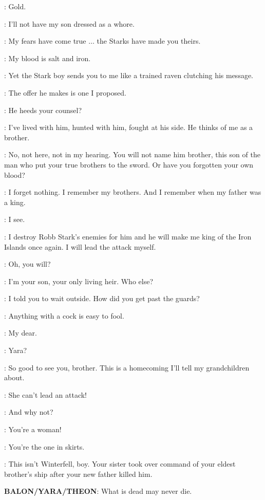 \THEON: Gold.

\BALON: I'll not have my son dressed as a whore.


\BALON: My fears have come true $\ldots$ the Starks have made you theirs.

\THEON: My blood is salt and iron.

\BALON: Yet the Stark boy sends you to me like a trained raven clutching his message.

\THEON: The offer he makes is one I proposed.

\BALON: He heeds your counsel?

\THEON: I've lived with him, hunted with him, fought at his side. He thinks of me as a brother.

\BALON: No, not here, not in my hearing. You will not name him brother, this son of the man who put your true brothers to the sword. Or have you forgotten your own blood?

\THEON: I forget nothing. I remember my brothers. And I remember when my father was a king.

\BALON: I see.

\THEON: I destroy Robb Stark's enemies for him and he will make me king of the Iron Islands once again. I will lead the attack myself.

\BALON: Oh, you will?

\THEON: I'm your son, your only living heir. Who else?


\THEON: I told you to wait outside. How did you get past the guards?

\YARA: Anything with a cock is easy to fool.

\BALON: My dear.

\THEON: Yara?

\YARA: So good to see you, brother. This is a homecoming I'll tell my grandchildren about.

\THEON: She can't lead an attack!

\BALON: And why not?

\THEON: You're a woman!

\YARA: You're the one in skirts.

\BALON: This isn't Winterfell, boy. Your sister took over command of your eldest brother's ship after your new father killed him.

\textbf{BALON/YARA/THEON}:  What is dead may never die.

